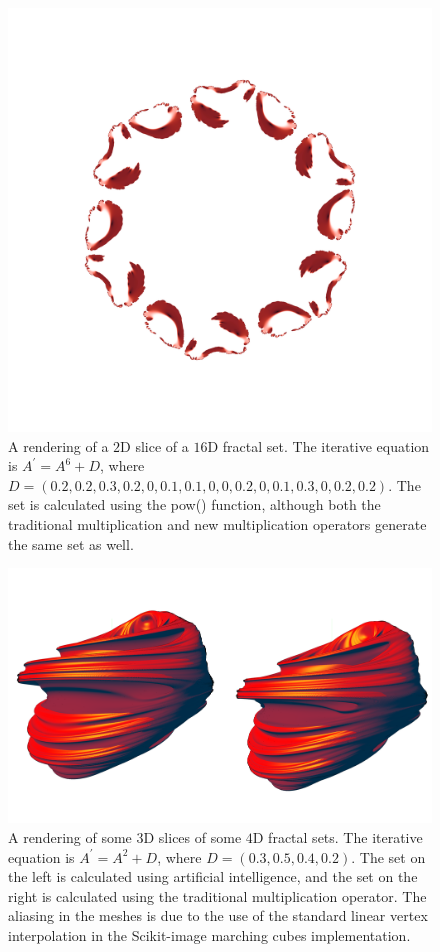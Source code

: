 \documentclass[12pt]{article}
\begin{document}
\begin{figure} 
\centering
  \includegraphics[width = 6 in]{16d_pow6.png}
  \caption{A rendering of a $2$D slice of a $16$D fractal set.
The iterative equation is $A^{\prime} = A^6 + D$, where $D = (0.2, 0.2, 0.3, 0.2, 0, 0.1, 0.1, 0, 0, 0.2, 0, 0.1, 0.3, 0, 0.2, 0.2)$.
The set is calculated using the pow() function, although both the traditional multiplication and new multiplication operators generate the same set as well.
}
\end{figure}



\begin{figure} 
\centering
  \includegraphics[width = 6 in]{ai_versus_ground_truth.png}
  \caption{A rendering of some $3$D slices of some $4$D fractal sets.
The iterative equation is $A^{\prime} = A^2 + D$, where $D = (0.3, 0.5, 0.4, 0.2)$.
The set on the left is calculated using artificial intelligence, and the set on the right is calculated using the traditional multiplication operator.
The aliasing in the meshes is due to the use of the standard linear vertex interpolation in the Scikit-image marching cubes implementation.
}
\end{figure}
\end{document}
